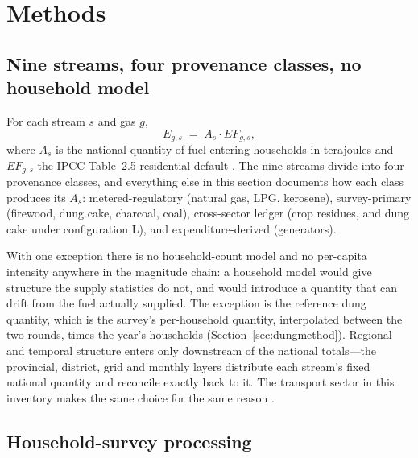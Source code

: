 \section{Methods}
\label{sec:methods}

\subsection{Nine streams, four provenance classes, no household model}

For each stream $s$ and gas $g$,
\begin{equation}
E_{g,s} \;=\; A_s \cdot EF_{g,s},
\end{equation}
where $A_s$ is the national quantity of fuel entering households in terajoules and
$EF_{g,s}$ the IPCC Table~2.5 residential default \citep{ipcc2006stationary}. The nine
streams divide into four provenance classes, and everything else in this section
documents how each class produces its $A_s$: metered-regulatory (natural gas, LPG,
kerosene), survey-primary (firewood, dung cake, charcoal, coal), cross-sector ledger (crop
residues, and dung cake under configuration L), and expenditure-derived (generators).

With one exception there is no household-count model and no per-capita intensity anywhere
in the magnitude
chain: a household model would give structure the supply statistics do not, and would
introduce a quantity that can drift from the fuel actually supplied. The exception is the
reference dung quantity, which is the survey's per-household quantity, interpolated
between the two rounds, times the year's households
(Section~\ref{sec:dungmethod}). Regional and
temporal structure enters only downstream of the national totals---the provincial,
district, grid and monthly layers distribute each stream's fixed national quantity and
reconcile exactly back to it. The transport sector in this inventory makes the same
choice for the same reason \citep{ahmad2026national}.

\subsection{Household-survey processing}
\label{sec:hiesmethod}

